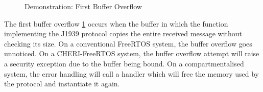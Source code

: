 \documentclass[a4paper, 11pt]{article}
\begin{document}
\begin{figure}
        \begin{center}
        \end{center}
        \caption{Demonstration: First Buffer Overflow} 
		\label{fig:demo_overflow}

	\end{figure}

The first buffer overflow \ref{fig:demo_overflow} occurs when the buffer in which the function implementing the J1939 protocol copies the entire received message without checking its size. On a conventional FreeRTOS system, the buffer overflow goes unnoticed.
On a CHERI-FreeRTOS system, the buffer overflow attempt will raise a security exception due to the buffer being bound. On a compartmentalised system, the error handling will call a handler which will free the memory used by the protocol and instantiate it again.
\end{document}
